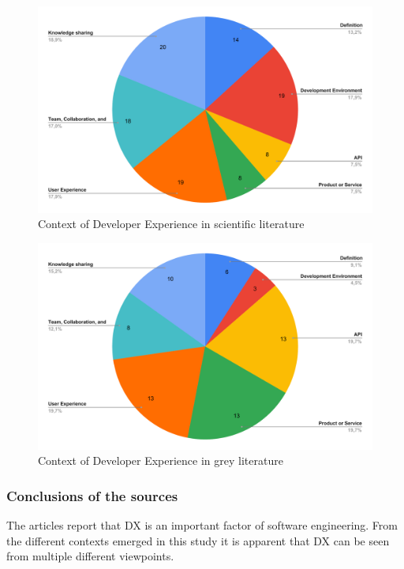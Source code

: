 \documentclass[english, 12pt, a4paper, sci, utf8, a-1b, online]{aaltothesis}
\begin{document}
\begin{figure}[ht]
  \caption{Context of Developer Experience in scientific literature}
  \begin{center}
    \includegraphics[width=\textwidth]{context-scientific.pdf}
  \end{center}
\end{figure}

\begin{figure}[ht]
  \caption{Context of Developer Experience in grey literature}
  \begin{center}
    \includegraphics[width=\textwidth]{context-grey.pdf}
  \end{center}
\end{figure}

\subsubsection{Conclusions of the sources}

The articles report that DX is an important factor of software engineering. From the different contexts emerged in this study it is apparent that DX can be seen from multiple different viewpoints.
\end{document}
